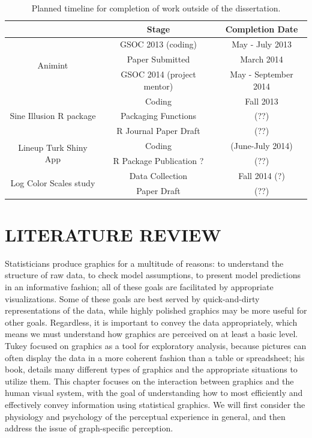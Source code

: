 \documentclass[11pt]{isuthesis}\usepackage[]{graphicx}\usepackage[]{color}
\begin{document}
\begin{table}[htbp]\centering
\begin{tabular}{|c|c|c|}\hline
 & Stage & Completion Date\\\hline
\multirow{3}{*}{Animint} & GSOC 2013 (coding) & May - July 2013\\
 & Paper Submitted & March 2014\\
 & GSOC 2014 (project mentor) & May - September 2014\\\hline
\multirow{3}{*}{Sine Illusion R package} & Coding & Fall 2013\\
 & Packaging Functions & (??)\\
 & R Journal Paper Draft & (??)\\\hline
\multirow{2}{*}{Lineup Turk Shiny App} & Coding & (June-July 2014)\\
 & R Package Publication ? & (??)\\\hline
\multirow{2}{*}{Log Color Scales study} & Data Collection & Fall 2014 (?) \\
 & Paper Draft & (??)\\\hline
\end{tabular}
\caption{Planned timeline for completion of work outside of the dissertation.}
\end{table}




\graphicspath{{Figure/LitReview/}{Images/LitReview/}}
\renewcommand{\floatpagefraction}{.99}




\chapter{LITERATURE REVIEW}\label{litreview}

Statisticians produce graphics for a multitude of reasons: to understand the structure of raw data, to check model assumptions, to present model predictions in an informative fashion; all of these goals are facilitated by appropriate visualizations. Some of these goals are best served by quick-and-dirty representations of the data, while highly polished graphics may be more useful for other goals. Regardless, it is important to convey the data appropriately, which means we must understand how graphics are perceived on at least a basic level. Tukey focused on graphics as a tool for exploratory analysis, because pictures can often display the data in a more coherent fashion than a table or spreadsheet; his book, \citet{eda} details many different types of graphics and the appropriate situations to utilize them. This chapter focuses on the interaction between graphics and the human visual system, with the goal of understanding how  to most efficiently and effectively convey information using statistical graphics. We will first consider the physiology and psychology of the perceptual experience in general, and then address the issue of graph-specific perception. 
\end{document}
